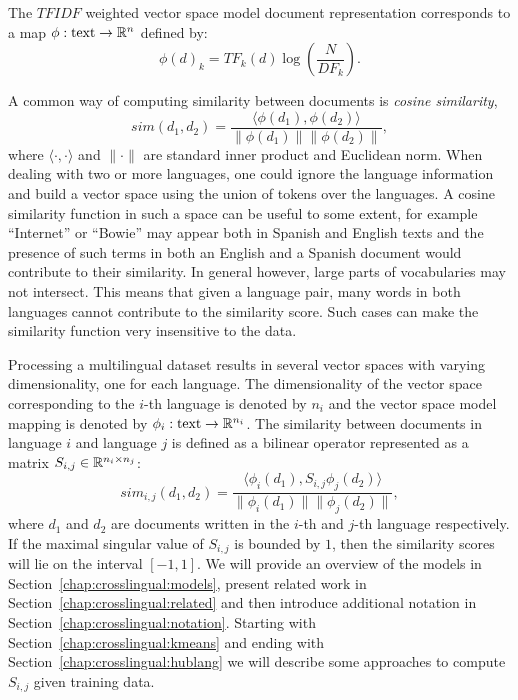 The $TFIDF$ weighted vector space model document representation corresponds
to a map $\phi : \text{text} \rightarrow \mathbb{R}^n$ defined by:
$$\phi(d)_k = {TF}_k(d) \log\left( \frac{N}{{DF}_k}\right).$$

A common way of computing similarity between documents is \emph{cosine similarity},
$$sim(d_1, d_2) = \frac{\langle \phi(d_1), \phi(d_2)\rangle}{\|\phi(d_1)\| \|\phi(d_2)\|},$$
where $\langle \cdot,\cdot \rangle$ and $\|\cdot\|$ are standard inner product and
Euclidean norm. When dealing with two or more languages, one could ignore the language information
and build a vector space using the union of tokens over the languages. A cosine similarity
function in such a space can be useful to some extent, for example ``Internet'' or ``Bowie''
may appear both in Spanish and English texts and the presence of such terms in both an
English and a Spanish document would contribute to their similarity. In general however,
large parts of vocabularies may not intersect. This means that given a language pair,
many words in both languages cannot contribute to the similarity score. Such cases
can make the similarity function very insensitive to the data.

Processing a multilingual dataset results in several vector spaces with varying dimensionality,
one for each language. The dimensionality of the vector space corresponding to the $i$-th
language is denoted by $n_i$ and the vector space model mapping is denoted by
$\phi_i : \text{text} \rightarrow \mathbb{R}^{n_i}$.
The similarity between documents in language $i$ and language $j$ is defined as a bilinear
operator represented as a matrix $S_{i,j} \in \mathbb{R}^{n_i \times n_j}$:
$$sim_{i,j}(d_1, d_2) = \frac{ \langle \phi_i (d_1), S_{i,j} \phi_j (d_2) \rangle }{\|\phi_i(d_1)\| \|\phi_j(d_2)\|},$$
where $d_1$ and $d_2$ are documents written in the $i$-th and $j$-th language respectively.
If the maximal singular value of $S_{i,j}$ is bounded by $1$, then the similarity scores
will lie on the interval $[-1, 1]$. We will provide an overview of the models in
Section~\ref{chap:crosslingual:models}, present related work in Section~\ref{chap:crosslingual:related} 
and then introduce additional notation in Section~\ref{chap:crosslingual:notation}.
Starting with Section~\ref{chap:crosslingual:kmeans} and ending with Section~\ref{chap:crosslingual:hublang} we will
describe some approaches to compute $S_{i,j}$ given training data.

